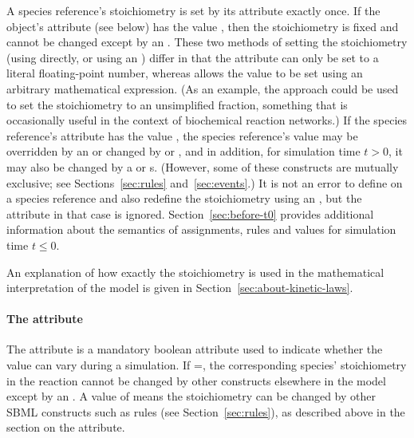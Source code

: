 A species reference's stoichiometry is set by its
 attribute exactly once.  If the
\SpeciesReference object's  attribute (see below)
has the value , then the stoichiometry is fixed and
cannot be changed except by an \InitialAssignment.  These two
methods of setting the stoichiometry (\ie using
 directly, or using an \InitialAssignment)
differ in that the  attribute can only be set
to a literal floating-point number, whereas \InitialAssignment
allows the value to be set using an arbitrary mathematical
expression.  (As an example, the approach could be used to set the
stoichiometry to an unsimplified fraction, something that is
occasionally useful in the context of biochemical reaction
networks.)  If the species reference's  attribute
has the value , the species reference's value may be
overridden by an \InitialAssignment or changed by \AssignmentRule
or \AlgebraicRule, and in addition, for simulation time $t > 0$,
it may also be changed by a \RateRule or \Event{}s.  (However,
some of these constructs are mutually exclusive; see
Sections~\ref{sec:rules} and~\ref{sec:events}.)  It is not an
error to define  on a species reference and
also redefine the stoichiometry using an \InitialAssignment, but
the  attribute in that case is ignored.
Section~\ref{sec:before-t0} provides additional information about
the semantics of assignments, rules and values for simulation time
$t \leq 0$.

An explanation of how exactly the stoichiometry is used in the
mathematical interpretation of the model is given in
Section~\ref{sec:about-kinetic-laws}.


\paragraph{The  attribute}

The \SpeciesReference attribute  is a
mandatory boolean attribute used to indicate whether the
 value can vary during a simulation.  If
=, the corresponding species'
stoichiometry in the reaction cannot be changed by other
constructs elsewhere in the model except by an \InitialAssignment.
A value of  means the stoichiometry can be changed by
other SBML constructs such as rules (see Section~\ref{sec:rules}),
as described above in the section on the 
attribute.


